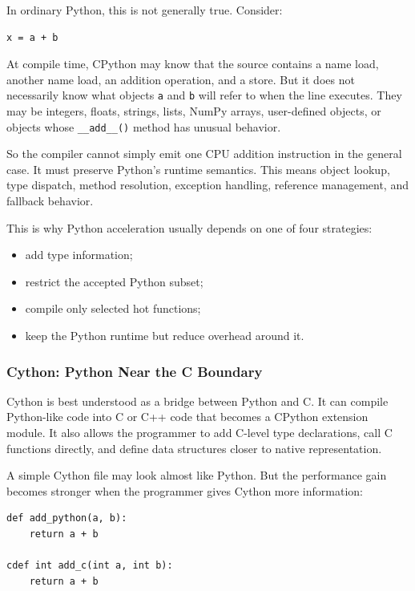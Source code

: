 In ordinary Python, this is not generally true. Consider:

\begin{verbatim}
x = a + b
\end{verbatim}

At compile time, CPython may know that the source contains a name load, another name load, an addition operation, and a store. But it does not necessarily know what objects \texttt{a} and \texttt{b} will refer to when the line executes. They may be integers, floats, strings, lists, NumPy arrays, user-defined objects, or objects whose \texttt{\_\_add\_\_()} method has unusual behavior.

So the compiler cannot simply emit one CPU addition instruction in the general case. It must preserve Python's runtime semantics. This means object lookup, type dispatch, method resolution, exception handling, reference management, and fallback behavior.

This is why Python acceleration usually depends on one of four strategies:

\begin{itemize}
    \item add type information;
    \item restrict the accepted Python subset;
    \item compile only selected hot functions;
    \item keep the Python runtime but reduce overhead around it.
\end{itemize}

\subsubsection{Cython: Python Near the C Boundary}

Cython is best understood as a bridge between Python and C. It can compile Python-like code into C or C++ code that becomes a CPython extension module. It also allows the programmer to add C-level type declarations, call C functions directly, and define data structures closer to native representation.

A simple Cython file may look almost like Python. But the performance gain becomes stronger when the programmer gives Cython more information:

\begin{verbatim}
def add_python(a, b):
    return a + b

cdef int add_c(int a, int b):
    return a + b
\end{verbatim}

